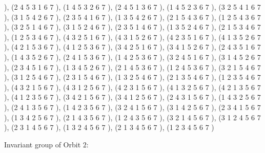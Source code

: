 \documentclass[12pt]{article}
\begin{document}
\begin{enumerate}
 ), (2 4 5 3 1 6 7  ), (1 4 5 3 2 6 7  ), (2 4 5 1 3 6 7  ), (1 4 5 2 3 6 7  ), (3 2 5 4 1 6 7  ), (3 1 5 4 2 6 7  ), (2 3 5 4 1 6 7  ), (1 3 5 4 2 6 7  ), (2 1 5 4 3 6 7  ), (1 2 5 4 3 6 7  ), (3 2 5 1 4 6 7  ), (3 1 5 2 4 6 7  ), (2 3 5 1 4 6 7  ), (1 3 5 2 4 6 7  ), (2 1 5 3 4 6 7  ), (1 2 5 3 4 6 7  ), (4 3 2 5 1 6 7  ), (4 3 1 5 2 6 7  ), (4 2 3 5 1 6 7  ), (4 1 3 5 2 6 7  ), (4 2 1 5 3 6 7  ), (4 1 2 5 3 6 7  ), (3 4 2 5 1 6 7  ), (3 4 1 5 2 6 7  ), (2 4 3 5 1 6 7  ), (1 4 3 5 2 6 7  ), (2 4 1 5 3 6 7  ), (1 4 2 5 3 6 7  ), (3 2 4 5 1 6 7  ), (3 1 4 5 2 6 7  ), (2 3 4 5 1 6 7  ), (1 3 4 5 2 6 7  ), (2 1 4 5 3 6 7  ), (1 2 4 5 3 6 7  ), (3 2 1 5 4 6 7  ), (3 1 2 5 4 6 7  ), (2 3 1 5 4 6 7  ), (1 3 2 5 4 6 7  ), (2 1 3 5 4 6 7  ), (1 2 3 5 4 6 7  ), (4 3 2 1 5 6 7  ), (4 3 1 2 5 6 7  ), (4 2 3 1 5 6 7  ), (4 1 3 2 5 6 7  ), (4 2 1 3 5 6 7  ), (4 1 2 3 5 6 7  ), (3 4 2 1 5 6 7  ), (3 4 1 2 5 6 7  ), (2 4 3 1 5 6 7  ), (1 4 3 2 5 6 7  ), (2 4 1 3 5 6 7  ), (1 4 2 3 5 6 7  ), (3 2 4 1 5 6 7  ), (3 1 4 2 5 6 7  ), (2 3 4 1 5 6 7  ), (1 3 4 2 5 6 7  ), (2 1 4 3 5 6 7  ), (1 2 4 3 5 6 7  ), (3 2 1 4 5 6 7  ), (3 1 2 4 5 6 7  ), (2 3 1 4 5 6 7  ), (1 3 2 4 5 6 7  ), (2 1 3 4 5 6 7  ), (1 2 3 4 5 6 7  )
\end{enumerate}
Invariant group of Orbit $2$:
\end{document}
